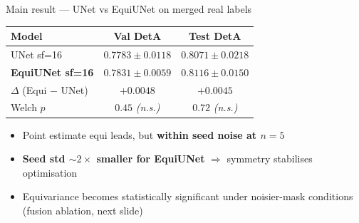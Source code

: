 \documentclass[10pt,aspectratio=169]{beamer}
\newcommand{\hilite}[1]{\textbf{\color{blue!60!black}#1}}
\begin{document}
\begin{frame}{Main result --- UNet vs EquiUNet on merged real labels}
  \centering
  \begin{tabular}{l c c}
    \toprule
    Model                       & Val DetA                 & Test DetA \\
    \midrule
    UNet sf=16                  & $0.7783 \pm 0.0118$      & $0.8071 \pm 0.0218$ \\
    \hilite{EquiUNet sf=16}     & \hilite{$0.7831 \pm 0.0059$} & \hilite{$0.8116 \pm 0.0150$} \\
    \midrule
    $\Delta$ (Equi $-$ UNet)    & $+0.0048$                & $+0.0045$ \\
    Welch $p$                   & $0.45$ \textit{(n.s.)}   & $0.72$ \textit{(n.s.)} \\
    \bottomrule
  \end{tabular}

  \vspace{3mm}
  \begin{itemize}\setlength\itemsep{2pt}
    \item Point estimate equi leads, but \hilite{within seed noise at $n=5$}
    \item \hilite{Seed std $\sim 2{\times}$ smaller for EquiUNet}
          $\Rightarrow$ symmetry stabilises optimisation
    \item Equivariance becomes statistically significant under noisier-mask
          conditions (fusion ablation, next slide)
  \end{itemize}
\end{frame}
\end{document}
